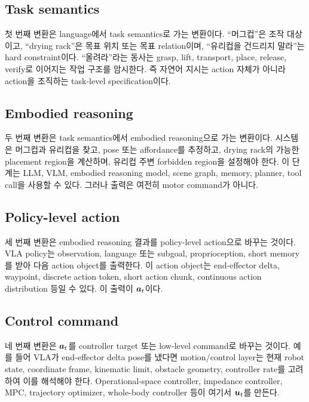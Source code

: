 \subsection{Task semantics}
첫 번째 변환은 language에서 task semantics로 가는 변환이다. ``머그컵''은 조작 대상이고, ``drying rack''은 목표 위치 또는 목표 relation이며, ``유리컵을 건드리지 말라''는 hard constraint이다. ``올려라''라는 동사는 grasp, lift, transport, place, release, verify로 이어지는 작업 구조를 암시한다. 즉 자연어 지시는 action 자체가 아니라 action을 조직하는 task-level specification이다.

\subsection{Embodied reasoning}
두 번째 변환은 task semantics에서 embodied reasoning으로 가는 변환이다. 시스템은 머그컵과 유리컵을 찾고, pose 또는 affordance를 추정하고, drying rack의 가능한 placement region을 계산하며, 유리컵 주변 forbidden region을 설정해야 한다. 이 단계는 LLM, VLM, embodied reasoning model, scene graph, memory, planner, tool call을 사용할 수 있다. 그러나 출력은 여전히 motor command가 아니다.

\subsection{Policy-level action}
세 번째 변환은 embodied reasoning 결과를 policy-level action으로 바꾸는 것이다. VLA policy는 observation, language 또는 subgoal, proprioception, short memory를 받아 다음 action object를 출력한다. 이 action object는 end-effector delta, waypoint, discrete action token, short action chunk, continuous action distribution 등일 수 있다. 이 출력이 $\bm{a}_t$이다.

\subsection{Control command}
네 번째 변환은 $\bm{a}_t$를 controller target 또는 low-level command로 바꾸는 것이다. 예를 들어 VLA가 end-effector delta pose를 냈다면 motion/control layer는 현재 robot state, coordinate frame, kinematic limit, obstacle geometry, controller rate를 고려하여 이를 해석해야 한다. Operational-space controller, impedance controller, MPC, trajectory optimizer, whole-body controller 등이 여기서 $\bm{u}_t$를 만든다.

